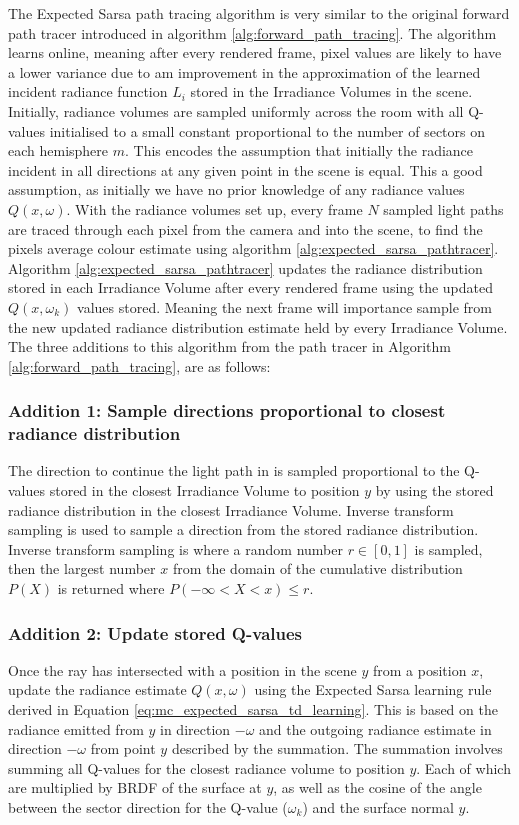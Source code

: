 \documentclass[../dissertation.tex]{subfiles}
\begin{document}
The Expected Sarsa path tracing algorithm is very similar to the original forward path tracer introduced in algorithm \ref{alg:forward_path_tracing}. The algorithm learns online, meaning after every rendered frame, pixel values are likely to have a lower variance due to am improvement in the approximation of the learned incident radiance function $L_i$ stored in the Irradiance Volumes in the scene. Initially, radiance volumes are sampled uniformly across the room with all Q-values initialised to a small constant proportional to the number of sectors on each hemisphere $m$. This encodes the assumption that initially the radiance incident in all directions at any given point in the scene is equal. This a good assumption, as initially we have no prior knowledge of any radiance values $Q(x, \omega)$. With the radiance volumes set up, every frame $N$ sampled light paths are traced through each pixel from the camera and into the scene, to find the pixels average colour estimate using algorithm \ref{alg:expected_sarsa_pathtracer}. Algorithm \ref{alg:expected_sarsa_pathtracer} updates the radiance distribution stored in each Irradiance Volume after every rendered frame using the updated $Q(x, \omega_k)$ values stored. Meaning the next frame will importance sample from the new updated radiance distribution estimate held by every Irradiance Volume. The three additions to this algorithm from the path tracer in Algorithm \ref{alg:forward_path_tracing}, are as follows:

\subsubsection*{Addition 1: Sample directions proportional to closest radiance distribution}
The direction to continue the light path in is sampled proportional to the Q-values stored in the closest Irradiance Volume to position $y$ by using the stored radiance distribution in the closest Irradiance Volume.  Inverse transform sampling \cite{devroye2006nonuniform} is used to sample a direction from the stored radiance distribution. Inverse transform sampling is where a random number $r \in [0,1]$ is sampled, then the largest number $x$ from the domain of the cumulative distribution $P(X)$ is returned where $ P(-\infty < X < x) \leq r$. 

\subsubsection*{Addition 2: Update stored Q-values}
Once the ray has intersected with a position in the scene $y$ from a position $x$, update the radiance estimate $Q(x, \omega)$ using the Expected Sarsa learning rule derived in Equation \ref{eq:mc_expected_sarsa_td_learning}. This is based on the radiance emitted from $y$ in direction $-\omega$ and the outgoing radiance estimate in direction $-\omega$ from point $y$ described by the summation. The summation involves summing all Q-values for the closest radiance volume to position $y$. Each of which are multiplied by BRDF of the surface at $y$, as well as the cosine of the angle between the sector direction for the Q-value ($\omega_k$) and the surface normal $y$.
\end{document}
